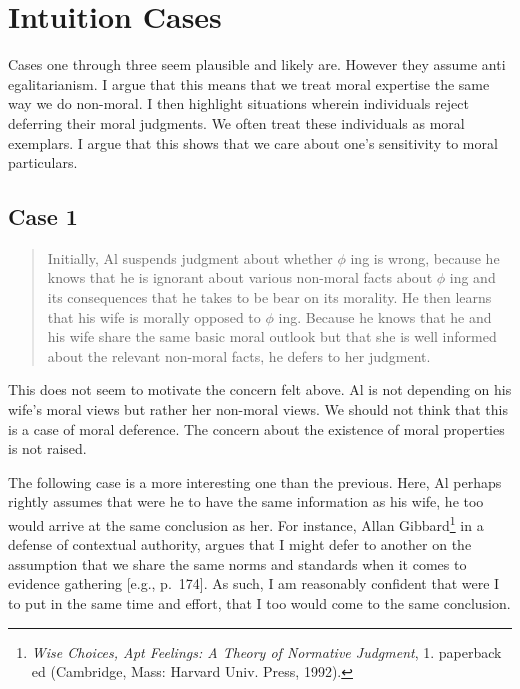 \documentclass[phdthesis,12pt,final,a4paper]{wuthesis}
\theoremstyle{definition}
\theoremstyle{definition}
\theoremstyle{definition}
\theoremstyle{definition}
\theoremstyle{remark}
\begin{document}
\section{Intuition Cases}\label{intuition-cases}

Cases one through three seem plausible and likely are. However they assume anti egalitarianism. I argue that this means that we treat moral expertise the same way we do non-moral. I then highlight situations wherein individuals reject deferring their moral judgments. We often treat these individuals as moral exemplars. I argue that this shows that we care about one's sensitivity to moral particulars.

\subsection*{Case 1}\label{case-1}

\begin{quote}
Initially, Al suspends judgment about whether \(\phi\) ing is wrong, because he knows that he is ignorant about various non-moral facts about \(\phi\) ing and its consequences that he takes to be bear on its morality. He then learns that his wife is morally opposed to \(\phi\) ing. Because he knows that he and his wife share the same basic moral outlook but that she is well informed about the relevant non-moral facts, he defers to her judgment.
\end{quote}

This does not seem to motivate the concern felt above. Al is not depending on his wife's moral views but rather her non-moral views. We should not think that this is a case of moral deference. The concern about the existence of moral properties is not raised.

The following case is a more interesting one than the previous. Here, Al perhaps rightly assumes that were he to have the same information as his wife, he too would arrive at the same conclusion as her. For instance, Allan Gibbard\footnote{\emph{Wise Choices, Apt Feelings: A Theory of Normative Judgment}, 1. paperback ed (Cambridge, Mass: Harvard Univ. Press, 1992).} in a defense of contextual authority, argues that I might defer to another on the assumption that we share the same norms and standards when it comes to evidence gathering {[}e.g., p.~174{]}. As such, I am reasonably confident that were I to put in the same time and effort, that I too would come to the same conclusion.
\end{document}
